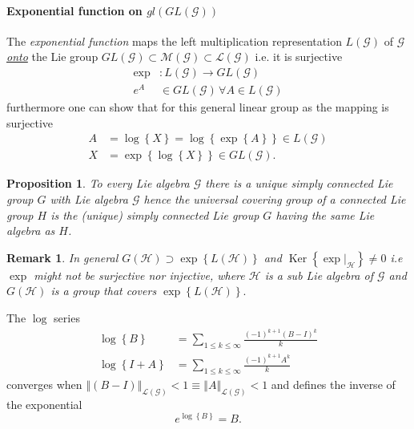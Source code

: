 \documentclass[aps,preprint]{revtex4}%
\newtheorem{proposition}[theorem]{Proposition}
\newtheorem{remark}[theorem]{Remark}
\begin{document}
\paragraph{Exponential function on $gl\left(  GL\left(  \mathcal{G}\right)
\right)  $}

The \emph{exponential function} maps the left multiplication representation
$L\left(  \mathcal{G}\right)  $ of $\mathcal{G}$ \underline{\emph{onto}} the
Lie group $GL\left(  \mathcal{G}\right)  \subset\mathcal{M}\left(
\mathcal{G}\right)  \subset\mathcal{L}\left(  \mathcal{G}\right)  $ i.e. it is
surjective
\begin{align}
\exp &  :L\left(  \mathcal{G}\right)  \rightarrow GL\left(  \mathcal{G}%
\right)  \\
e^{A} &  \in GL\left(  \mathcal{G}\right)  \,\forall A\in L\left(
\mathcal{G}\right)
\end{align}
furthermore one can show that for this general linear group as the mapping is
surjective
\begin{align}
A  & =\log\left\{  X\right\}  =\log\left\{  \exp\left\{  A\right\}  \right\}
\in L\left(  \mathcal{G}\right)  \\
X  & =\exp\left\{  \log\left\{  X\right\}  \right\}  \in GL\left(
\mathcal{G}\right)  .
\end{align}


\begin{proposition}
To every Lie algebra $\mathcal{G}$ there is a unique simply connected Lie
group $G$ with Lie algebra $\mathcal{G}$ hence the universal covering group of
a connected Lie group $H$ is the \emph{(unique)} simply connected Lie group
$G$ having the same Lie algebra as $H$.
\end{proposition}

\begin{remark}
In general $G\left(  \mathcal{H}\right)  \supset\exp\left\{  L\left(
\mathcal{H}\right)  \right\}  $ and $\operatorname{Ker}\left\{  \left.
\exp\right\vert _{\mathcal{H}}\right\}  \neq0$ i.e $\exp$ \emph{might not be
surjective nor injective}, where $\mathcal{H}$ is a sub Lie algebra of
$\mathcal{G}$ and $G\left(  \mathcal{H}\right)  $ is a group that
\emph{covers} $\exp\left\{  L\left(  \mathcal{H}\right)  \right\}  .$
\end{remark}

The $\log$ series
\begin{align}
\log\left\{  B\right\}    & =\sum_{1\leq k\leq\infty}\frac{\left(  -1\right)
^{k+1}\left(  B-I\right)  ^{k}}{k}\\
\log\left\{  I+A\right\}    & =\sum_{1\leq k\leq\infty}\frac{\left(
-1\right)  ^{k+1}A^{k}}{k}%
\end{align}
converges when $\left\Vert \left(  B-I\right)  \right\Vert _{\mathcal{L}%
\left(  \mathcal{G}\right)  }<1\equiv\left\Vert A\right\Vert _{\mathcal{L}%
\left(  \mathcal{G}\right)  }<1$ and defines the inverse of the exponential
\begin{equation}
e^{\log\left\{  B\right\}  }=B.
\end{equation}
\end{document}
